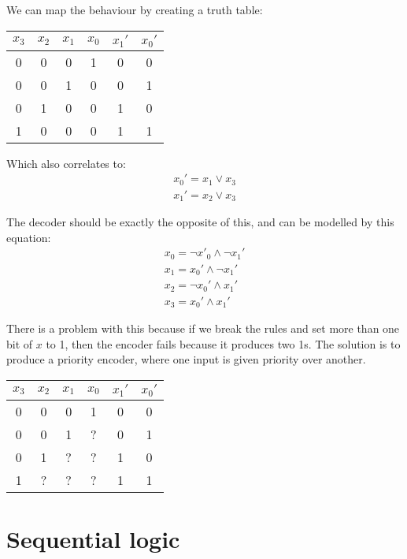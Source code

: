 \documentclass[11pt,a4paper,titlepage,dvipsnames,cmyk]{scrartcl}
\begin{document}
We can map the behaviour by creating a truth table:
\begin{center}
    \begin{tabular}{|c c c c|c c|}
        \hline
        $x_3$& $x_2$ & $x_1$ & $x_0$ & $x_1'$ & $x_0'$ \\
        \hline
        0 & 0 & 0 & 1 & 0 & 0 \\
        \hline
        0 & 0 & 1 & 0 & 0 & 1 \\
        \hline
        0 & 1 & 0 & 0 & 1 & 0 \\
        \hline
        1 & 0 & 0 & 0 & 1 & 1 \\
        \hline
    \end{tabular}
\end{center}
Which also correlates to:
\begin{align*}
    x_0' = x_1 \vee x_3 \\
    x_1' = x_2 \vee x_3
\end{align*}

The decoder should be exactly the opposite of this, and can be modelled by
this equation:
\begin{align*}
    x_0 = \neg x'_0 \wedge \neg x_1' \\
    x_1 = x_0' \wedge \neg x_1' \\
    x_2 = \neg x_0' \wedge x_1' \\
    x_3 = x_0' \wedge x_1'
\end{align*}

There is a problem with this because if we break the rules and set more
than one bit of $x$ to 1, then the encoder fails because it produces two
1s. The solution is to produce a priority encoder, where one input is
given priority over another. 
\begin{center}
    \begin{tabular}{|c c c c|c c|}
        \hline
        $x_3$& $x_2$ & $x_1$ & $x_0$ & $x_1'$ & $x_0'$ \\
        \hline
        0 & 0 & 0 & 1 & 0 & 0 \\
        \hline
        0 & 0 & 1 & ? & 0 & 1 \\
        \hline
        0 & 1 & ? & ? & 1 & 0 \\
        \hline
        1 & ? & ? & ? & 1 & 1 \\
        \hline
    \end{tabular}
\end{center}

\section{Sequential logic}%
\label{sec:sequential}
\end{document}
